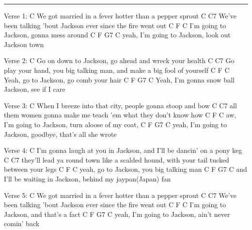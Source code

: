 \noindent\rule{\columnwidth}{1pt}

\begin{lstsong}
Verse 1:
C
We got married in a fever hotter than a pepper sprout
C                                  C7
We've been talking 'bout Jackson  ever since the fire went out
C                F                   C
I'm going to  Jackson, gonna mess around
C                      F        G7               C
yeah, I'm going to  Jackson,  look out Jackson  town

Verse 2:
C
Go on down to Jackson, go ahead and wreck your health
C                                                    C7
Go play your hand, you big talking man, and make a big fool of yourself
C               F                     C
Yeah, go to  Jackson, go comb your  hair
C                 F                  G7         C
Yeah, I'm gonna snow ball Jackson,  see if I  care

Verse 3:
C
When I breeze into that city, people gonna stoop and bow
C                               C7
all them women gonna make me  teach 'em what they don't know how
C                    F                          C
aw, I'm going to  Jackson, turn aloose of my  coat,
 C                     F        G7                        C
yeah, I'm going to  Jackson,  goodbye, that's all she  wrote

Verse 4: 
 C
I'm gonna laugh at you in Jackson, and I'll be dancin' on a pony keg
C                                                      C7
they'll lead ya round town like a scalded hound, with your  tail tucked between your legs
C                F                      C
yeah, go to  Jackson, you big talking  man
C                          F       G7                     C
and I'll be waiting in  Jackson, behind my jaypan(Japan) fan

Verse 5:
C
We got married in a fever hotter than a pepper sprout
C                                  C7
We've been talking 'bout Jackson  ever since the fire went out
C                 F                   C
I'm going to  Jackson, and that's a  fact
C                      F        G7                 C
yeah, I'm going to  Jackson,  ain't never comin'  back
\end{lstsong}
\newpage



